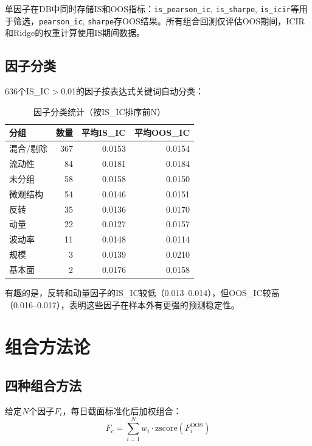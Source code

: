 \documentclass[11pt,a4paper]{ctexart}
\begin{document}
单因子在DB中同时存储IS和OOS指标：\texttt{is\_pearson\_ic}, \texttt{is\_sharpe}, \texttt{is\_icir}等用于筛选，\texttt{pearson\_ic}, \texttt{sharpe}存OOS结果。所有组合回测仅评估OOS期间，ICIR和Ridge的权重计算使用IS期间数据。

\subsection{因子分类}

636个IS\_IC$>$0.01的因子按表达式关键词自动分类：

\begin{table}[H]
\centering
\caption{因子分类统计（按IS\_IC排序前N）}
\begin{tabular}{lrrr}
\toprule
\textbf{分组} & \textbf{数量} & \textbf{平均IS\_IC} & \textbf{平均OOS\_IC} \\
\midrule
混合/剔除   & 367 & 0.0153 & 0.0154 \\
流动性       & 84  & 0.0181 & 0.0184 \\
未分组       & 58  & 0.0158 & 0.0150 \\
微观结构     & 54  & 0.0146 & 0.0151 \\
反转         & 35  & 0.0136 & 0.0170 \\
动量         & 22  & 0.0127 & 0.0157 \\
波动率       & 11  & 0.0148 & 0.0114 \\
规模         & 3   & 0.0139 & 0.0210 \\
基本面       & 2   & 0.0176 & 0.0158 \\
\bottomrule
\end{tabular}
\end{table}

有趣的是，反转和动量因子的IS\_IC较低（0.013--0.014），但OOS\_IC较高（0.016--0.017），表明这些因子在样本外有更强的预测稳定性。

\section{组合方法论}

\subsection{四种组合方法}

给定$N$个因子$F_i$，每日截面标准化后加权组合：
\begin{equation}
F_c = \sum_{i=1}^N w_i \cdot \text{zscore}(F_i^{\text{OOS}})
\end{equation}
\end{document}
